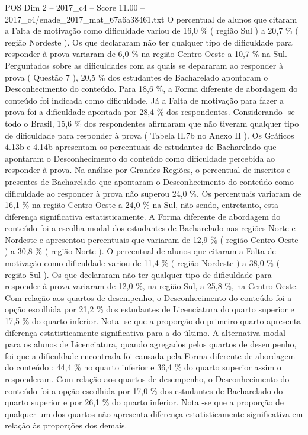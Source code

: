\begin{textsample}{POS Dim 2 – 2017\_c4 – Score 11.00 – 2017\_c4/enade\_2017\_mat\_67a6a38461.txt}
O percentual de alunos que citaram a Falta de motivação como dificuldade variou de 16,0 \% ( região Sul ) a 20,7 \% ( região Nordeste ).
Os que declararam não ter qualquer tipo de dificuldade para responder à prova variaram de 6,0 \% na região Centro-Oeste a 10,7 \% na Sul.
Perguntados sobre as dificuldades com as quais se depararam ao responder à prova ( Questão 7 ), 20,5 \% dos estudantes de Bacharelado apontaram o Desconhecimento do conteúdo.
Para 18,6 \%, a Forma diferente de abordagem do conteúdo foi indicada como dificuldade.
Já a Falta de motivação para fazer a prova foi a dificuldade apontada por 28,4 \% dos respondentes.
Considerando -se todo o Brasil, 15,6 \% dos respondentes afirmaram que não tiveram qualquer tipo de dificuldade para responder à prova ( Tabela II.7b no Anexo II ).
Os Gráficos 4.13b e 4.14b apresentam os percentuais de estudantes de Bacharelado que apontaram o Desconhecimento do conteúdo como dificuldade percebida ao responder à prova.
Na análise por Grandes Regiões, o percentual de inscritos e presentes de Bacharelado que apontaram o Desconhecimento do conteúdo como dificuldade ao responder à prova não superou 24,0 \%.
Os percentuais variaram de 16,1 \% na região Centro-Oeste a 24,0 \% na Sul, não sendo, entretanto, esta diferença significativa estatisticamente.
A Forma diferente de abordagem do conteúdo foi a escolha modal dos estudantes de Bacharelado nas regiões Norte e Nordeste e apresentou percentuais que variaram de 12,9 \% ( região Centro-Oeste ) a 30,8 \% ( região Norte ).
O percentual de alunos que citaram a Falta de motivação como dificuldade variou de 11,4 \% ( região Nordeste ) a 38,0 \% ( região Sul ).
Os que declararam não ter qualquer tipo de dificuldade para responder à prova variaram de 12,0 \%, na região Sul, a 25,8 \%, na Centro-Oeste.
Com relação aos quartos de desempenho, o Desconhecimento do conteúdo foi a opção escolhida por 21,2 \% dos estudantes de Licenciatura do quarto superior e 17,5 \% do quarto inferior.
Nota -se que a proporção do primeiro quarto apresenta diferença estatisticamente significativa para a do último.
A alternativa modal para os alunos de Licenciatura, quando agregados pelos quartos de desempenho, foi que a dificuldade encontrada foi causada pela Forma diferente de abordagem do conteúdo : 44,4 \% no quarto inferior e 36,4 \% do quarto superior assim o responderam.
Com relação aos quartos de desempenho, o Desconhecimento do conteúdo foi a opção escolhida por 17,0 \% dos estudantes de Bacharelado do quarto superior e por 26,1 \% do quarto inferior.
Nota -se que a proporção de qualquer um dos quartos não apresenta diferença estatisticamente significativa em relação às proporções dos demais.

\end{textsample}
